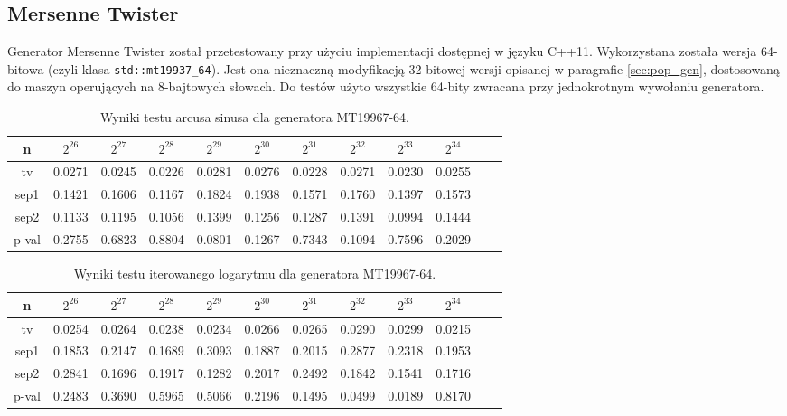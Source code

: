 \documentclass[a4paper,11pt,twoside]{book}
\theoremstyle{definition}
\begin{document}
\subsection{Mersenne Twister}
Generator Mersenne Twister został przetestowany przy użyciu implementacji dostępnej w języku C++11. Wykorzystana została wersja 64-bitowa (czyli klasa \texttt{std::mt19937\_64}). Jest ona nieznaczną modyfikacją 32-bitowej wersji opisanej w paragrafie \ref{sec:pop_gen}, dostosowaną do maszyn operujących na 8-bajtowych słowach. Do testów użyto wszystkie 64-bity zwracana przy jednokrotnym wywołaniu generatora.

\begin{table}[ht!]
\centering
 \caption{Wyniki testu arcusa sinusa dla generatora MT19967-64.}
 \label{tab:twister_asin}
\begin{tabular} {||c|c|c|c|c|c|c|c|c|c|c|c||}  
 \hline
     n &  $2^{26}$ &  $2^{27}$ &  $2^{28}$ &  $2^{29}$ &  $2^{30}$ &  $2^{31}$ &  $2^{32}$ &  $2^{33}$ &  $2^{34}$\\ \hline
     tv &  0.0271 &  0.0245 &  0.0226 &  0.0281 &  0.0276 &  0.0228 &  0.0271 &  0.0230 &  0.0255\\ \hline
   sep1 &  0.1421 &  0.1606 &  0.1167 &  0.1824 &  0.1938 &  0.1571 &  0.1760 &  0.1397 &  0.1573\\ \hline
   sep2 &  0.1133 &  0.1195 &  0.1056 &  0.1399 &  0.1256 &  0.1287 &  0.1391 &  0.0994 &  0.1444\\ \hline
  p-val &  0.2755 &  0.6823 &  0.8804 &  0.0801 &  0.1267 &  0.7343 &  0.1094 &  0.7596 &  0.2029\\ \hline
\end{tabular}  
\end{table}
\begin{table}[ht!]
\centering
 \caption{Wyniki testu iterowanego logarytmu dla generatora MT19967-64.}
 \label{tab:twister_lil}
\begin{tabular} {||c|c|c|c|c|c|c|c|c|c|c|c||}  
 \hline 
     n &  $2^{26}$ &  $2^{27}$ &  $2^{28}$ &  $2^{29}$ &  $2^{30}$ &  $2^{31}$ &  $2^{32}$ &  $2^{33}$ &  $2^{34}$\\ \hline
     tv &  0.0254 &  0.0264 &  0.0238 &  0.0234 &  0.0266 &  0.0265 &  0.0290 &  0.0299 &  0.0215\\ \hline
   sep1 &  0.1853 &  0.2147 &  0.1689 &  0.3093 &  0.1887 &  0.2015 &  0.2877 &  0.2318 &  0.1953\\ \hline
   sep2 &  0.2841 &  0.1696 &  0.1917 &  0.1282 &  0.2017 &  0.2492 &  0.1842 &  0.1541 &  0.1716\\ \hline
  p-val &  0.2483 &  0.3690 &  0.5965 &  0.5066 &  0.2196 &  0.1495 &  0.0499 &  0.0189 &  0.8170\\ \hline
\end{tabular}  
\end{table}
\end{document}
